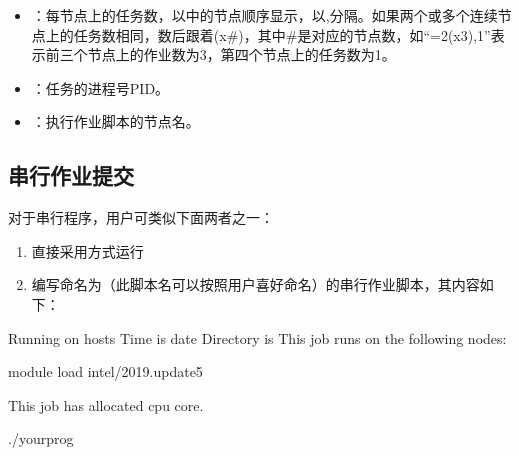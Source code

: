 \documentclass[a4paper,12pt,english]{sphinxmanual}
\begin{document}
\begin{itemize}
\item {} 
\sphinxAtStartPar
{}：每节点上的任务数，以中的节点顺序显示，以,分隔。如果两个或多个连续节点上的任务数相同，数后跟着(x\#)，其中\#是对应的节点数，如“=2(x3),1”表示前三个节点上的作业数为3，第四个节点上的任务数为1。

\item {} 
\sphinxAtStartPar
{}：任务的进程号PID。

\item {} 
\sphinxAtStartPar
{}：执行作业脚本的节点名。

\end{itemize}


\subsection{串行作业提交}
\label{\detokenize{slurm/slurm:id29}}
\sphinxAtStartPar
对于串行程序，用户可类似下面两者之一：
\begin{enumerate}
%
\item {} 
\sphinxAtStartPar
直接采用方式运行

\item {} 
\sphinxAtStartPar
编写命名为（此脚本名可以按照用户喜好命名）的串行作业脚本，其内容如下：

\end{enumerate}

\begin{sphinxVerbatim}[commandchars=\\\{\}]

 Running on hosts
 Time is date
 Directory is 
 This job runs on the following nodes:
 

module load intel/2019.update5

 This job has allocated  cpu core.

./yourprog
\end{sphinxVerbatim}
\end{document}
